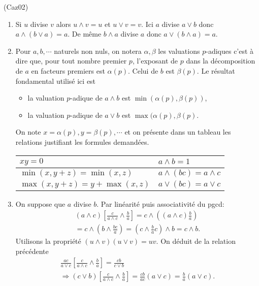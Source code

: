 \begin{tiny}(Caz02)\end{tiny} 
\begin{enumerate}
 \item Si $u$ divise $v$ alors $u \wedge v = u$ et $u \vee v = v$. Ici $a$ divise $a\vee b$ donc 
$a\wedge(b \vee a) = a$. De même $b\wedge a$ divise $a$ donc $a \vee (b \wedge a) = a$.

  \item Pour $a, b, \cdots$ naturels non nuls, on notera $\alpha, \beta$ les valuations $p$-adiques c'est à dire que, pour tout nombre premier $p$, l'exposant de $p$ dans la décomposition de $a$ en facteurs premiers est $\alpha(p)$. Celui de $b$ est $\beta(p)$. Le résultat fondamental utilisé ici est
\begin{itemize}
 \item la valuation $p$-adique de $a\wedge b$ est $\min(\alpha(p), \beta(p))$,
 \item la valuation $p$-adique de $a\vee b$ est $\max(\alpha(p), \beta(p)$.
\end{itemize}
On note $x=\alpha(p), y = \beta(p), \cdots$ et on présente dans un tableau les relations justifiant les formules demandées.

\begin{center}
\renewcommand{\arraystretch}{1.3}
\begin{tabular}{|l|l|} \hline
 $xy = 0$ & $a\wedge b  = 1$ \\ \hline
 $\min(x, y + z) = \min(x,z)$ & $a\wedge(bc) = a \wedge c$ \\ \hline
 $\max(x, y + z) = y + \max(x,z)$ & $a\vee(bc) = a \vee c$ \\ \hline
\end{tabular} 
\end{center}

 \item On suppose que $a$ divise $b$. Par linéarité puis associativité du pgcd:
\begin{multline*}
 (a\wedge c)\left[ \frac{c}{a\wedge c} \wedge \frac{b}{a}\right]
 = c \wedge \left( (a\wedge c)\frac{b}{a}\right) \\
 = c \wedge \left( b \wedge \frac{bc}{a}\right)
 = \left( c \wedge \frac{b}{a}c\right)  \wedge b = c \wedge b.
\end{multline*}
Utilisons la propriété $(u \wedge v) (u \vee v) = uv$.\newline 
On déduit de la relation précédente
\begin{multline*}
\frac{ac}{a\vee c}\left[ \frac{c}{a\wedge c} \wedge \frac{b}{a}\right] 
 = \frac{cb}{ c \vee b}\\
 \Rightarrow 
(c \vee b) \left[ \frac{c}{a\wedge c} \wedge \frac{b}{a}\right] 
 = \frac{cb}{ac }(a\vee c) = \frac{b}{a}(a\vee c).
\end{multline*}


\end{enumerate}
